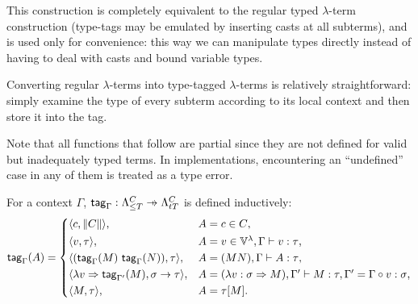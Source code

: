 \documentclass[main.tex]{subfiles}
\begin{document}
This construction is completely equivalent to the regular typed $\lambda$-term
construction (type-tags may be emulated by inserting casts at all subterms),
and is used only for convenience: this way we can manipulate types directly
instead of having to deal with casts and bound variable types.

Converting regular $\lambda$-terms into type-tagged $\lambda$-terms is
relatively straightforward: simply examine the type of every subterm according
to its local context and then store it into the tag.

Note that all functions that follow are partial since they are not defined for
valid but inadequately typed terms. In implementations,
encountering an ``undefined'' case in any of them is treated as a type error.


\begin{defn}
    \label{def:ttag}
    For a context $\Gamma$,
    $\mcf{tag}_{\Gamma} : \fancylambda{T}{C} \pfun \ttlambda{T}{C}$
    is defined inductively:
    \[
        \mcf{tag}_{\Gamma}(A) =
        \begin{cases*}
            \ttt{c}{\typeof{C}} ,& $A = c \in C$, \\
            \ttt{v}{\tau} ,& $A = v \in \lvars, \Gamma \vdash v : \tau$, \\
            \ttt{(\mcf{tag}_{\Gamma}(M) \app \mcf{tag}_{\Gamma}(N))}{\tau}
 ,& $A = (MN), \Gamma \vdash A : \tau$, \\
            \ttt{\lambda v \abstr \mcf{tag}_{\Gamma'}(M)}{\sigma \tot \tau}
 ,& $A = (\lambda v: \sigma \abstr M)
                 , \Gamma' \vdash M : \tau
                 , \Gamma' = \Gamma \circ v : \sigma$,\\
            \ttt{M}{\tau} ,& $A = \tau[M]$. \\
        \end{cases*}
    \]
\end{defn}
\end{document}
